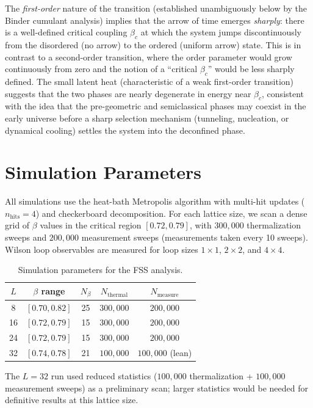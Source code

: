 \documentclass{article}
\begin{document}
The \emph{first-order} nature of the transition (established unambiguously below by the Binder cumulant analysis) implies that the arrow of time emerges \emph{sharply}: there is a well-defined critical coupling $\beta_c$ at which the system jumps discontinuously from the disordered (no arrow) to the ordered (uniform arrow) state. This is in contrast to a second-order transition, where the order parameter would grow continuously from zero and the notion of a ``critical $\beta_c$'' would be less sharply defined. The small latent heat (characteristic of a weak first-order transition) suggests that the two phases are nearly degenerate in energy near $\beta_c$, consistent with the idea that the pre-geometric and semiclassical phases may coexist in the early universe before a sharp selection mechanism (tunneling, nucleation, or dynamical cooling) settles the system into the deconfined phase.

\section{Simulation Parameters}

All simulations use the heat-bath Metropolis algorithm with multi-hit updates ($n_\text{hits} = 4$) and checkerboard decomposition. For each lattice size, we scan a dense grid of $\beta$ values in the critical region $[0.72, 0.79]$, with $300{,}000$ thermalization sweeps and $200{,}000$ measurement sweeps (measurements taken every 10 sweeps). Wilson loop observables are measured for loop sizes $1\times 1$, $2\times 2$, and $4\times 4$.

\begin{table}[htbp]
\centering
\caption{Simulation parameters for the FSS analysis.}
\label{tab:t20d-params}
\begin{tabular}{@{}ccccc@{}}
\toprule
$L$ & $\beta$ range & $N_\beta$ & $N_\text{thermal}$ & $N_\text{measure}$ \\
\midrule
8  & $[0.70, 0.82]$ & 25 & $300{,}000$ & $200{,}000$ \\
16 & $[0.72, 0.79]$ & 15 & $300{,}000$ & $200{,}000$ \\
24 & $[0.72, 0.79]$ & 15 & $300{,}000$ & $200{,}000$ \\
32 & $[0.74, 0.78]$ & 21 & $100{,}000$ & $100{,}000$ (lean) \\
\bottomrule
\end{tabular}
\end{table}

The $L=32$ run used reduced statistics ($100{,}000$ thermalization + $100{,}000$ measurement sweeps) as a preliminary scan; larger statistics would be needed for definitive results at this lattice size.
\end{document}
